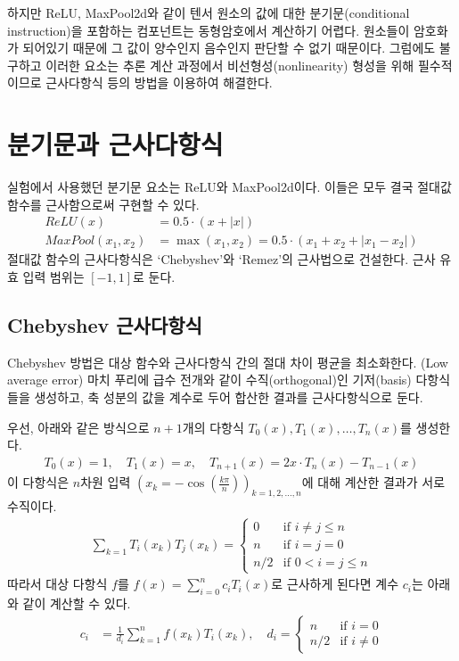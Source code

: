 \documentclass[a4paper, 11pt, chapterprefix=false]{report}
\begin{document}
하지만 ReLU, MaxPool2d와 같이 텐서 원소의 값에 대한 분기문(conditional
instruction)을 포함하는 컴포넌트는 동형암호에서 계산하기 어렵다. 원소들이
암호화가 되어있기 때문에 그 값이 양수인지 음수인지 판단할 수 없기 때문이다.
그럼에도 불구하고 이러한 요소는 추론 계산 과정에서 비선형성(nonlinearity) 형성을
위해 필수적이므로 근사다항식 등의 방법을 이용하여 해결한다. \cite{compare2019}

\section{분기문과 근사다항식}

실험에서 사용했던 분기문 요소는 ReLU와 MaxPool2d이다. 이들은 모두 결국 절대값
함수를 근사함으로써 구현할 수 있다.
\begin{align*}
  ReLU(x) &= 0.5 \cdot (x + |x|) \\
  MaxPool(x_1, x_2) &= \max(x_1, x_2) = 0.5 \cdot (x_1 + x_2 + |x_1 - x_2|)
\end{align*}
절대값 함수의 근사다항식은 `Chebyshev'와 `Remez'의 근사법으로 건설한다.
\cite{chebapprox} 근사 유효 입력 범위는 $[-1, 1]$로 둔다.

\subsection{Chebyshev 근사다항식}

Chebyshev 방법은 대상 함수와 근사다항식 간의 절대 차이 평균을 최소화한다. (Low
average error) 마치 푸리에 급수 전개와 같이 수직(orthogonal)인 기저(basis)
다항식들을 생성하고, 축 성분의 값을 계수로 두어 합산한 결과를 근사다항식으로
둔다.

우선, 아래와 같은 방식으로 $n+1$개의 다항식 $T_0(x), T_1(x), \dots, T_n(x)$를
생성한다.
\begin{gather*}
  T_0(x) = 1,\quad T_1(x) = x,\quad T_{n+1}(x) = 2x \cdot T_n(x) - T_{n-1}(x)
\end{gather*}
이 다항식은 $n$차원 입력 $(x_k = -\cos(\frac{k \pi}{n}))_{k = 1, 2, \dots, n}$에
대해 계산한 결과가 서로 수직이다.
\begin{align*}
  \sum_{k=1} T_i (x_k) T_j (x_k) = \left\{
    \begin{array}{ll}
      0 & \text{if $i \neq j \leq n$} \\
      n & \text{if $i = j = 0$} \\
      n/2 & \text{if $0 < i = j \leq n$}
    \end{array}
  \right.
\end{align*}
따라서 대상 다항식 $f$를 $f(x) = \sum_{i=0}^n c_i T_i(x)$로 근사하게 된다면 계수
$c_i$는 아래와 같이 계산할 수 있다.
\begin{align*}
  c_i &= \frac{1}{d_i} \sum_{k=1}^n f(x_k) T_i(x_k), \quad
  d_i = \left\{
    \begin{array}{ll}
      n & \text{if $i = 0$} \\
      n/2 & \text{if $i \neq 0$}
    \end{array}
  \right.
\end{align*}
\end{document}
